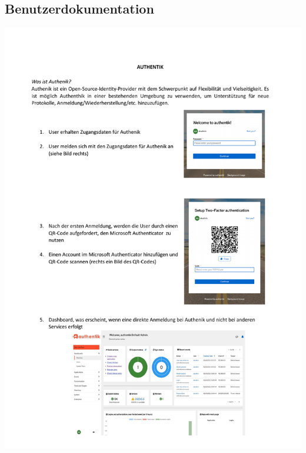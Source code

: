 \subsection{Benutzerdokumentation}
\label{app:Benutzerdokumentation}
% 
\includegraphics[scale=0.8]{Anhang/Benutzerdokumentation.pdf}